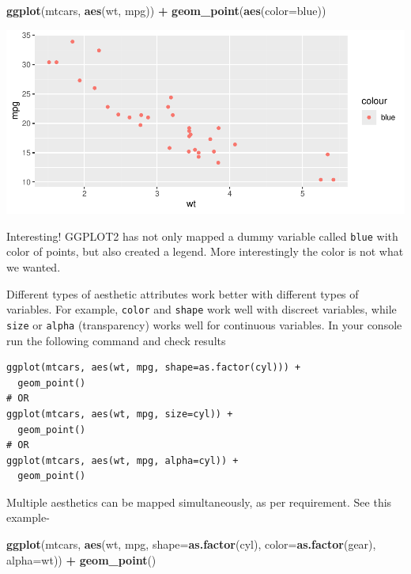 \documentclass[
]{book}
\newenvironment{Shaded}{\begin{snugshade}}{\end{snugshade}}
\newcommand{\AttributeTok}[1]{\textcolor[rgb]{0.13,0.29,0.53}{#1}}
\newcommand{\FunctionTok}[1]{\textcolor[rgb]{0.13,0.29,0.53}{\textbf{#1}}}
\newcommand{\NormalTok}[1]{#1}
\newcommand{\SpecialCharTok}[1]{\textcolor[rgb]{0.81,0.36,0.00}{\textbf{#1}}}
\newcommand{\StringTok}[1]{\textcolor[rgb]{0.31,0.60,0.02}{#1}}
\begin{document}
\begin{Shaded}
\begin{Highlighting}[]
\FunctionTok{ggplot}\NormalTok{(mtcars, }\FunctionTok{aes}\NormalTok{(wt, mpg)) }\SpecialCharTok{+}
  \FunctionTok{geom\_point}\NormalTok{(}\FunctionTok{aes}\NormalTok{(}\AttributeTok{color=}\StringTok{\textquotesingle{}blue\textquotesingle{}}\NormalTok{))}
\end{Highlighting}
\end{Shaded}

\begin{center}\includegraphics{DauR_files/figure-latex/fig_9-1} \end{center}

Interesting! GGPLOT2 has not only mapped a dummy variable called \texttt{\textquotesingle{}blue\textquotesingle{}} with color of points, but also created a legend. More interestingly the color is not what we wanted.

Different types of aesthetic attributes work better with different types of variables. For example, \texttt{color} and \texttt{shape} work well with discreet variables, while \texttt{size} or \texttt{alpha} (transparency) works well for continuous variables. In your console run the following command and check results

\begin{verbatim}
ggplot(mtcars, aes(wt, mpg, shape=as.factor(cyl))) +
  geom_point()
# OR
ggplot(mtcars, aes(wt, mpg, size=cyl)) +
  geom_point()
# OR
ggplot(mtcars, aes(wt, mpg, alpha=cyl)) +
  geom_point()
\end{verbatim}

Multiple aesthetics can be mapped simultaneously, as per requirement. See this example-

\begin{Shaded}
\begin{Highlighting}[]
\FunctionTok{ggplot}\NormalTok{(mtcars, }\FunctionTok{aes}\NormalTok{(wt, mpg, }\AttributeTok{shape=}\FunctionTok{as.factor}\NormalTok{(cyl), }\AttributeTok{color=}\FunctionTok{as.factor}\NormalTok{(gear), }\AttributeTok{alpha=}\NormalTok{wt)) }\SpecialCharTok{+}
  \FunctionTok{geom\_point}\NormalTok{()}
\end{Highlighting}
\end{Shaded}
\end{document}
